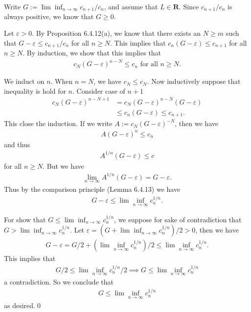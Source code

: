 \documentclass{book}
\begin{document}
Write $G:=\lim\inf_{n\to\infty} c_{n+1}/c_n$, and assume that $L\in\mathbf{R}$. Since $ c_{n+1}/c_n$ is always positive, we know that $G\geq 0$.

Let $\varepsilon>0$. By Proposition 6.4.12(a), we know that there exists an $N\geq m$ such that $G-\varepsilon\leq c_{n+1}/c_n$ for all $n\geq N$. This implies that $c_n(G-\varepsilon)\leq c_{n+1}$ for all $n\geq N$. By induction, we show that this implies that
    \begin{align*}
        c_N(G-\varepsilon)^{n-N}\leq c_{n}\text{ for all }n\geq N.
    \end{align*}

    We induct on $n$. When $n=N$, we have $c_N\leq c_N$. Now inductively suppose that inequality is hold for $n$. Consider case of $n+1$
    \begin{align*}
        c_{N}(G-\varepsilon)^{n-N+1}&=c_{N}(G-\varepsilon)^{n-N}(G-\varepsilon)\\
        &\leq c_n(G-\varepsilon)\leq c_{n+1}.
    \end{align*}
This close the induction. If we write $A:=c_N(G-\varepsilon)^{-N}$, then we have
    \begin{align*}
        A(G-\varepsilon)^{n}\leq c_{n}
    \end{align*}
and thus
    \begin{align*}
        A^{1/n}(G-\varepsilon)\leq c
    \end{align*}
for all $n\geq N$. But we have
    \begin{align*}
        \lim_{n\to\infty}A^{1/n}(G-\varepsilon)=G-\varepsilon.
    \end{align*}
Thus by the comparison principle (Lemma 6.4.13) we have
    \begin{align*}
        G-\varepsilon\leq\lim\inf_{n\to\infty}c_{n}^{1/n}.
    \end{align*}

For show that $G\leq\lim\inf_{n\to\infty}c_{n}^{1/n}$, we suppose for sake of contradiction that $G>\lim\inf_{n\to\infty}c_{n}^{1/n}$. Let $\varepsilon=(G+\lim\inf_{n\to\infty}c_{n}^{1/n})/2>0$, then we have
    \begin{align*}
        G-\varepsilon=G/2+(\lim\inf_{n\to\infty}c_{n}^{1/n})/2\leq\lim\inf_{n\to\infty}c_{n}^{1/n}.
    \end{align*}
This implies that
    \begin{align*}
        G/2\leq\lim\inf_{n\to\infty}c_{n}^{1/n}/2\implies G\leq\lim\inf_{n\to\infty}c_{n}^{1/n}
    \end{align*}
a contradiction. So we conclude that
    \begin{align*}
        G\leq\lim\inf_{n\to\infty}c_{n}^{1/n}
    \end{align*}
as desired.\qed
\end{document}
